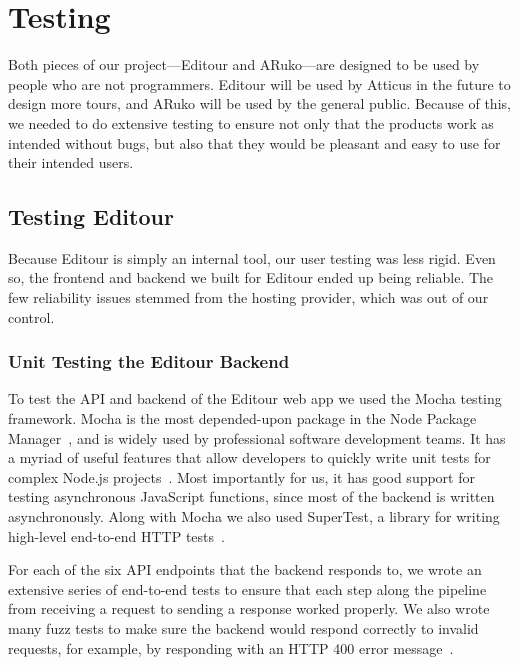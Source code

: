 \documentclass[a4paper, 10pt, american, titlepage]{article}
\begin{document}
\clearpage

\section{Testing}
\label{sec:testing}

Both pieces of our project---Editour and ARuko---are designed to be used by
people who are not programmers. Editour will be used by Atticus in the future to
design more tours, and ARuko will be used by the general public. Because of
this, we needed to do extensive testing to ensure not only that the products
work as intended without bugs, but also that they would be pleasant and easy to
use for their intended users.

\nocite{harvey2002} %

\subsection{Testing Editour}
\label{sec:testingEditour}

Because Editour is simply an internal tool, our user testing was less rigid.
Even so, the frontend and backend we built for Editour ended up being reliable.
The few reliability issues stemmed from the hosting provider, which was out of
our control.

\subsubsection{Unit Testing the Editour Backend}
\label{sec:unitTestingTheEditourBackend}

To test the API and backend of the Editour web app we used the Mocha testing
framework. Mocha is the most depended-upon package in the Node Package
Manager~\autocite{tidelift2019}, and is widely used by professional software
development teams. It has a myriad of useful features that allow developers to
quickly write unit tests for complex Node.js projects~\autocite{mochajs2019}.
Most importantly for us, it has good support for testing asynchronous JavaScript
functions, since most of the backend is written asynchronously. Along with Mocha
we also used SuperTest, a library for writing high-level end-to-end HTTP
tests~\autocite{supertest2019}.

For each of the six API endpoints that the backend responds to, we wrote an
extensive series of end-to-end tests to ensure that each step along the pipeline
from receiving a request to sending a response worked properly. We also wrote
many fuzz tests to make sure the backend would respond correctly to invalid
requests, for example, by responding with an HTTP 400 error
message~\autocite{rfc7231}.
\end{document}
